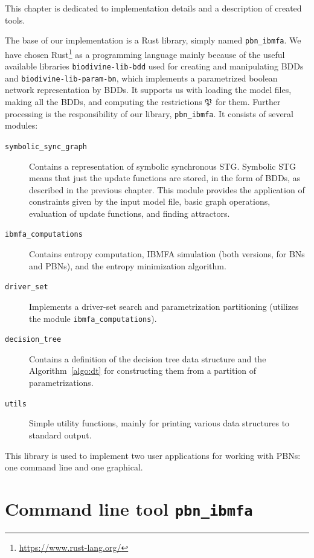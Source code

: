 \documentclass[
	digital, oneside, nosansbold, nocolorbold, nolot, nolof
]{fithesis4}
\theoremstyle{definition}
\theoremstyle{definition}
\begin{document}
This chapter is dedicated to implementation details and a description of
created tools.

The base of our implementation is a Rust library, simply named
\texttt{pbn\_ibmfa}. We have chosen
Rust\footnote{\url{https://www.rust-lang.org/}} as a programming language
mainly because of the useful available libraries \texttt{biodivine-lib-bdd}
used for creating and manipulating BDDs and \texttt{biodivine-lib-param-bn},
which implements a parametrized boolean network representation by BDDs. It
supports us with loading the model files, making all the BDDs, and computing
the restrictions $\mathfrak{P}$ for them. Further processing is the
responsibility of our library, \texttt{pbn\_ibmfa}. It consists of several
modules:
\begin{description}
\item[\texttt{symbolic\_sync\_graph}] Contains a representation of symbolic
    synchronous STG. Symbolic STG means that just the update functions are
    stored, in the form of BDDs, as described in the previous chapter. This
    module provides the application of constraints given by the input model
    file, basic graph operations, evaluation of update functions, and
    finding attractors.
\item[\texttt{ibmfa\_computations}] Contains entropy computation, IBMFA
    simulation (both versions, for BNs and PBNs), and the entropy minimization
    algorithm.
\item[\texttt{driver\_set}] Implements a driver-set search and parametrization
    partitioning (utilizes the module \texttt{ibmfa\_computations}).
\item[\texttt{decision\_tree}] Contains a definition of the decision tree data
    structure and the Algorithm~\ref{algo:dt} for constructing them from a
    partition of parametrizations.
\item[\texttt{utils}] Simple utility functions, mainly for printing various
    data structures to standard output.
\end{description}

This library is used to implement two user applications for working with PBNs:
one command line and one graphical.

\section{Command line tool \texttt{pbn\_ibmfa}}
\end{document}
